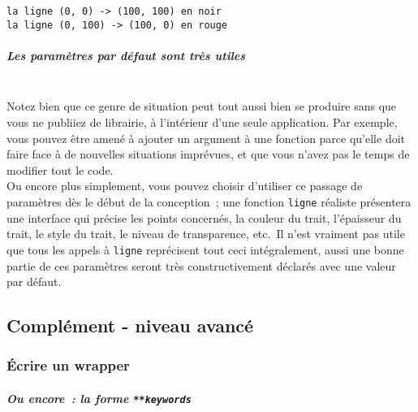     \begin{Verbatim}[commandchars=\\\{\}]
la ligne (0, 0) -> (100, 100) en noir
la ligne (0, 100) -> (100, 0) en rouge

    \end{Verbatim}

    \hypertarget{les-paramuxe8tres-par-duxe9faut-sont-truxe8s-utiles}{%
\subparagraph{Les paramètres par défaut sont très
utiles\\\\}\label{les-paramuxe8tres-par-duxe9faut-sont-truxe8s-utiles}}

    Notez bien que ce genre de situation peut tout aussi bien se produire
sans que vous ne publiiez de librairie, à l'intérieur d'une seule
application. Par exemple, vous pouvez être amené à ajouter un argument à
une fonction parce qu'elle doit faire face à de nouvelles situations
imprévues, et que vous n'avez pas le temps de modifier tout le code.\\

    Ou encore plus simplement, vous pouvez choisir d'utiliser ce passage de
paramètres dès le début de la conception~; une fonction \texttt{ligne}
réaliste présentera une interface qui précise les points concernés, la
couleur du trait, l'épaisseur du trait, le style du trait, le niveau de
transparence, etc.~Il n'est vraiment pas utile que tous les appels à
\texttt{ligne} reprécisent tout ceci intégralement, aussi une bonne
partie de ces paramètres seront très constructivement déclarés avec une
valeur par défaut.

    \hypertarget{compluxe9ment---niveau-avancuxe9}{%
\subsection{Complément - niveau
avancé}\label{compluxe9ment---niveau-avancuxe9}}

    \hypertarget{uxe9crire-un-wrapper}{%
\subsubsection{Écrire un wrapper}\label{uxe9crire-un-wrapper}}

    \hypertarget{ou-encore-la-forme-keywords}{%
\subparagraph{\texorpdfstring{Ou encore~: la forme
\texttt{**keywords}\\\\}{Ou encore~: la forme **keywords}}\label{ou-encore-la-forme-keywords}}


